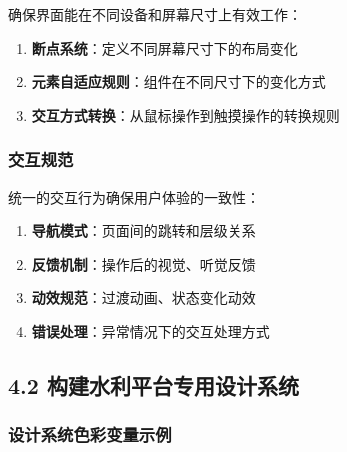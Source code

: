 确保界面能在不同设备和屏幕尺寸上有效工作：

\begin{enumerate}
\def\labelenumi{\arabic{enumi}.}
\tightlist
\item
  \textbf{断点系统}：定义不同屏幕尺寸下的布局变化
\item
  \textbf{元素自适应规则}：组件在不同尺寸下的变化方式
\item
  \textbf{交互方式转换}：从鼠标操作到触摸操作的转换规则
\end{enumerate}

\subsubsection{交互规范}\label{ux4ea4ux4e92ux89c4ux8303}

统一的交互行为确保用户体验的一致性：

\begin{enumerate}
\def\labelenumi{\arabic{enumi}.}
\tightlist
\item
  \textbf{导航模式}：页面间的跳转和层级关系
\item
  \textbf{反馈机制}：操作后的视觉、听觉反馈
\item
  \textbf{动效规范}：过渡动画、状态变化动效
\item
  \textbf{错误处理}：异常情况下的交互处理方式
\end{enumerate}

\subsection{4.2
构建水利平台专用设计系统}\label{ux6784ux5efaux6c34ux5229ux5e73ux53f0ux4e13ux7528ux8bbeux8ba1ux7cfbux7edf}

\subsubsection{设计系统色彩变量示例}\label{ux8bbeux8ba1ux7cfbux7edfux8272ux5f69ux53d8ux91cfux793aux4f8b}

